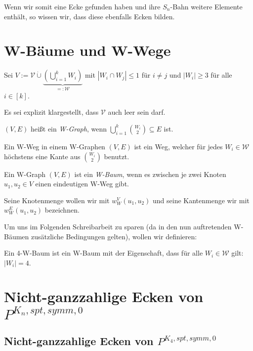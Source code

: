 \documentclass[10p,a4paper,BCOR = 12mm, DIV=15]{scrbook}
\begin{document}
Wenn wir somit eine Ecke gefunden haben und ihre $S_n$-Bahn weitere Elemente enthält, so wissen wir, dass diese ebenfalls Ecken bilden.

\section{W-Bäume und W-Wege}

\begin{Def}
Sei $V := \mathcal{V} \mathbin{\dot{\cup}} \underbrace{\left(\bigcup_{i=1}^k W_i\right)}_{=: \mathcal{W}} $ mit $\left|W_i \cap W_j\right| \leq 1$ für $i \neq j$ und $\left|W_i\right| \geq 3$ für alle $i\in \left[k\right]$.

Es sei explizit klargestellt, dass $\mathcal{V}$ auch leer sein darf.

$\left(V, E\right)$ heißt ein \emph{W-Graph}, wenn $\bigcup_{i=1}^k {W_i \choose 2} \subseteq E$ ist.
\end{Def}

\begin{Def}
Ein W-Weg in einem W-Graphen $\left(V, E\right)$ ist ein Weg, welcher für jedes $W_i \in \mathcal{W}$ höchstens eine Kante aus $W_i \choose 2$ benutzt.
\end{Def}

\begin{Def}
Ein W-Graph $\left(V, E\right)$ ist ein \emph{W-Baum}, wenn es zwischen je zwei Knoten $u_1, u_2 \in V$ einen eindeutigen W-Weg gibt.

Seine  Knotenmenge wollen wir mit $w_W^V\left(u_1, u_2\right)$ und 
seine Kantenmenge wir mit $w_W^E\left(u_1, u_2\right)$ bezeichnen.
\end{Def}

Um uns im Folgenden Schreibarbeit zu sparen (da in den nun auftretenden W-Bäumen zusätzliche Bedingungen gelten), wollen wir definieren:

\begin{Def}
Ein 4-W-Baum ist ein W-Baum mit der Eigenschaft, dass für alle $W_i \in \mathcal{W}$ gilt: $\left|W_i\right| = 4$.
\end{Def}

\section{Nicht-ganzzahlige Ecken von $P^{K_n, spt, symm, 0}$}

\subsection{Nicht-ganzzahlige Ecken von $P^{K_4, spt, symm, 0}$}
\end{document}
